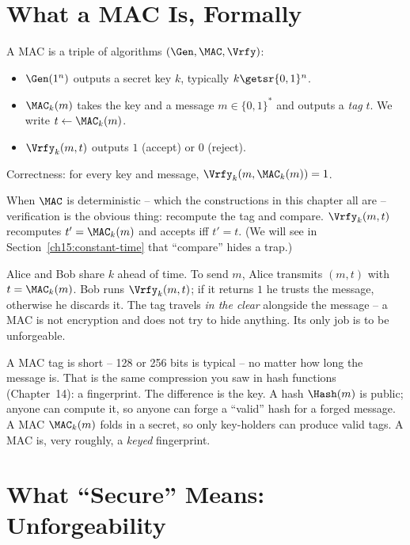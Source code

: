 \section{What a MAC Is, Formally}
\label{ch15:mac-syntax}

\begin{definition}
\label{ch15:def-mac}
A MAC is a triple of algorithms $(\Gen,\MAC,\Vrfy)$:
\begin{itemize}
  \item $\Gen(1^n)$ outputs a secret key $k$, typically $k\getsr\{0,1\}^n$.
  \item $\MAC_k(m)$ takes the key and a message $m\in\{0,1\}^*$ and outputs a \emph{tag} $t$. We write $t \gets \MAC_k(m)$.
  \item $\Vrfy_k(m,t)$ outputs $1$ (accept) or $0$ (reject).
\end{itemize}
Correctness: for every key and message, $\Vrfy_k(m,\MAC_k(m)) = 1$.
\end{definition}

When $\MAC$ is deterministic -- which the constructions in this chapter all are -- verification is the obvious thing: recompute the tag and compare. $\Vrfy_k(m,t)$ recomputes $t' = \MAC_k(m)$ and accepts iff $t' = t$. (We will see in Section~\ref{ch15:constant-time} that ``compare'' hides a trap.)

Alice and Bob share $k$ ahead of time. To send $m$, Alice transmits $(m, t)$ with $t=\MAC_k(m)$. Bob runs $\Vrfy_k(m,t)$; if it returns $1$ he trusts the message, otherwise he discards it. The tag travels \emph{in the clear} alongside the message -- a MAC is not encryption and does not try to hide anything. Its only job is to be unforgeable.

\begin{focusbox}
A MAC tag is short -- 128 or 256 bits is typical -- no matter how long the message is. That is the same compression you saw in hash functions (Chapter~14): a fingerprint. The difference is the key. A hash $\Hash(m)$ is public; anyone can compute it, so anyone can forge a ``valid'' hash for a forged message. A MAC $\MAC_k(m)$ folds in a secret, so only key-holders can produce valid tags. A MAC is, very roughly, a \emph{keyed} fingerprint.
\end{focusbox}

\section{What ``Secure'' Means: Unforgeability}
\label{ch15:unforgeability}

